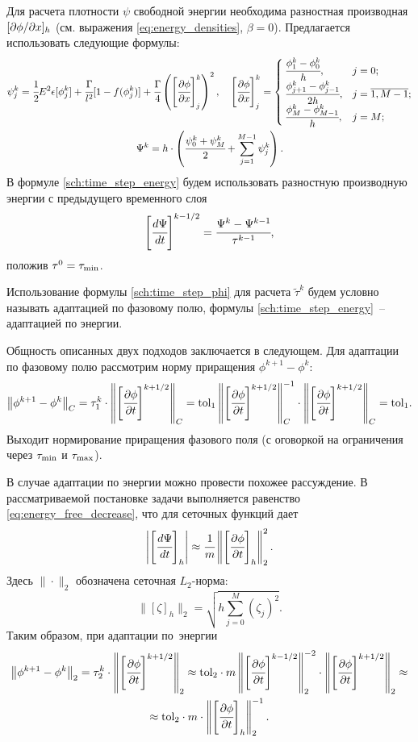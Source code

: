 Для расчета плотности $\psi$ свободной энергии необходима разностная производная $[\partial \phi / \partial x]_h$ (см. выражения \eqref{eq:energy_densities}, $\beta = 0$). Предлагается использовать следующие формулы:
\begin{gather*}
    \psi_j^k = \cfrac{1}{2} E^2 \epsilon[\phi_j^k] + \cfrac{\Gamma}{l^2} [1 - f(\phi_j^k)] + \cfrac{\Gamma}{4} \left( \left[ \cfrac{\partial \phi}{\partial x} \right]_j^k \right)^2, \quad \left[ \cfrac{\partial \phi}{\partial x} \right]_j^k = \begin{cases}
        \cfrac{\phi_1^k - \phi_0^k}{h},                 & j = 0; \\
        \cfrac{\phi_{j + 1}^k - \phi_{j - 1}^k}{2 h},   & j = \overline{1, M - 1}; \\
        \cfrac{\phi_M^k - \phi_{M - 1}^k}{h},           & j = M;
    \end{cases} \\
    \Psi^k = h \cdot \left( \cfrac{\psi_0^k + \psi_M^k}{2} + \sum\limits_{j = 1}^{M - 1} \psi_j^k \right).
\end{gather*}
В формуле \eqref{sch:time_step_energy} будем использовать разностную производную энергии с предыдущего временного слоя
\[
    \left[ \cfrac{d \Psi}{dt} \right]^{k - 1/2} = \cfrac{\Psi^k - \Psi^{k - 1}}{\tau^{k - 1}},
\]
положив $\tau^0 = {\tau_\text{min}}$.

Использование формулы \eqref{sch:time_step_phi} для расчета $\widetilde{\tau}^k$ будем условно называть адаптацией по фазовому полю, формулы \eqref{sch:time_step_energy}~-- адаптацией по энергии.

Общность описанных двух подходов заключается в следующем. Для адаптации по фазовому полю рассмотрим норму приращения $\phi^{k + 1} - \phi^k$:
\[
    \left\| \phi^{k + 1} - \phi^k \right\|_C = \tau_1^k \cdot \left\| \left[ \cfrac{\partial \phi}{\partial t} \right]^{k + 1/2} \right\|_C = {\text{tol}}_1 \left\| \left[ \cfrac{\partial \phi}{\partial t} \right]^{k + 1/2} \right\|_C^{-1} \cdot \left\| \left[ \cfrac{\partial \phi}{\partial t} \right]^{k + 1/2} \right\|_C = {\text{tol}}_1.
\]
Выходит нормирование приращения фазового поля (с оговоркой на ограничения через ${\tau_\text{min}}$ и ${\tau_\text{max}}$).

В случае адаптации по энергии можно провести похожее рассуждение. В рассматриваемой постановке задачи выполняется равенство \eqref{eq:energy_free_decrease}, что для сеточных функций дает
\[
    \left| \left[ \cfrac{d \Psi}{dt} \right]_h \right| \approx \cfrac{1}{m} \left\| \left[ \cfrac{\partial \phi}{\partial t} \right]_h \right\|_2^2.
\]
Здесь $\| \cdot \|_2$ обозначена сеточная $L_2$-норма:
\[
    \| [\zeta]_h \|_2 = \sqrt{h \sum\limits_{j = 0}^M (\zeta_j)^2}.
\]
Таким образом, при адаптации по~энергии
\begin{multline*}
    \left\| \phi^{k + 1} - \phi^k \right\|_2 = \tau_2^k \cdot \left\| \left[ \cfrac{\partial \phi}{\partial t} \right]^{k + 1/2} \right\|_2 \approx {\text{tol}}_2 \cdot m \left\| \left[ \cfrac{\partial \phi}{\partial t} \right]^{k - 1/2} \right\|_2^{-2} \cdot \left\| \left[ \cfrac{\partial \phi}{\partial t} \right]^{k + 1/2} \right\|_2 \approx \\ \approx {\text{tol}}_2 \cdot m \cdot \left\| \left[ \cfrac{\partial \phi}{\partial t} \right]_h \right\|_2^{-1}.
\end{multline*}

